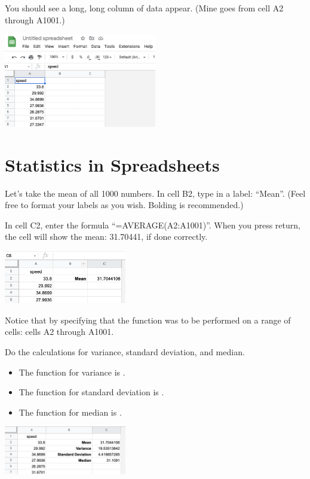 You should see a long, long column of data appear. (Mine goes from cell A2 through A1001.)

\includegraphics[width=0.5\textwidth]{ImportedCSV.png}

\section{Statistics in Spreadsheets}

Let's take the mean of all 1000 numbers.  In cell B2, type in a label:
``Mean''. (Feel free to format your labels as you wish. Bolding is recommended.)

In cell C2, enter the formula ``=AVERAGE(A2:A1001)''. When
you press return, the cell will show the mean: 31.70441, if done correctly.

\includegraphics[width=0.4\textwidth]{Spread_mean.png}

Notice that by specifying that the function  was to
be performed on a range of cells: cells A2 through A1001.

Do the calculations for variance, standard deviation, and median.

\begin{itemize}
\item The function for variance is .
\item The function for standard deviation is .
\item The function for median is .
\end{itemize}

\includegraphics[width=0.4\textwidth]{var_stdev_median.png}

